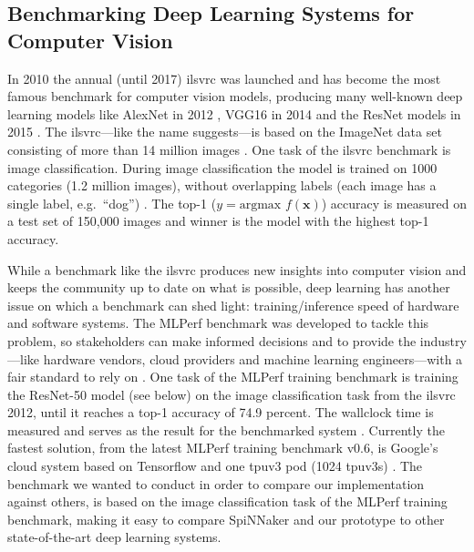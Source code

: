 \documentclass[]{article}
\begin{document}


\subsection{Benchmarking Deep Learning Systems for Computer Vision} %
\label{subsec:intro_bench}

In 2010 the annual (until 2017) \acrfull{ilsvrc}
was launched and has become the most famous benchmark for computer
vision models, producing many well-known deep learning models like
AlexNet in 2012 \citep{krizhevsky_et_al_2012}, VGG16 in 2014
\citep{simonyan_et_al_2014} and the ResNet models in 2015
\citep{he_et_al_2015}.
The \acrshort{ilsvrc}---like the name suggests---is based on the ImageNet data
set consisting of more than 14 million images
\citep{russakovsky_et_al_2015}.
One task of the \acrshort{ilsvrc} benchmark is image classification.
During image classification the model is trained on 1000 categories
(1.2 million images), without overlapping labels (each image has a
single label, e.g.~``dog'') \citep{russakovsky_et_al_2015}.
The top-1 ($y = \text{argmax } f(\mathbf{x})$) accuracy is measured on
a test set of 150,000 images and winner is the model with the highest
top-1 accuracy.

While a benchmark like the \acrshort{ilsvrc} produces new insights into computer
vision and keeps the community up to date on what is possible,
deep learning has another issue on which a benchmark can shed light:
training/inference speed of hardware and software systems.
The MLPerf benchmark was developed to tackle this problem, so
stakeholders can make informed decisions and to provide the
industry---like hardware vendors, cloud providers and machine learning
engineers---with a fair standard to rely on
\citep{mattson_et_al_2019}.
One task of the MLPerf training benchmark is training the ResNet-50
model (see below) on the image classification task from the \acrshort{ilsvrc}
2012, until it reaches a top-1 accuracy of 74.9 percent.
The wallclock time is measured and serves as the result for the
benchmarked system \citep{mattson_et_al_2019}.
Currently the fastest solution, from the latest MLPerf training
benchmark v0.6, is Google's cloud system based on Tensorflow and
one \acrshort{tpu}v3 pod (1024 \acrshort{tpu}v3s)
\citep{mlperf_2019, stone_2019}.
The benchmark we wanted to conduct in order to compare our
implementation against others, is based
on the image classification task of the MLPerf training benchmark,
making it easy to compare SpiNNaker and our prototype to other
state-of-the-art deep learning systems.
\end{document}
